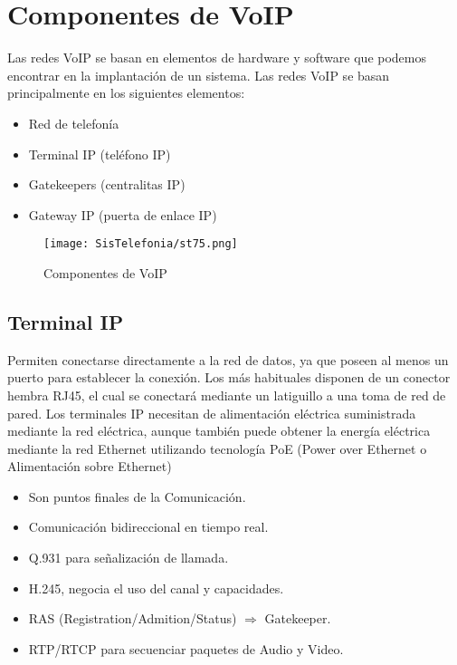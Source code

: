 \documentclass[
	12pt, %
	fleqn, %
	a4paper, %
	oneside, %
]{LegrandOrangeBook}
\begin{document}
\section{Componentes de VoIP}
Las redes VoIP se basan en elementos de hardware y software que podemos encontrar en la implantación de un sistema.
Las redes VoIP se basan principalmente en los siguientes elementos:
\begin{itemize}
\item Red de telefonía
\item Terminal IP (teléfono IP)
\item Gatekeepers (centralitas IP)
\item Gateway IP (puerta de enlace IP)
\end{itemize}
\begin{figure}[H]
\centering
\texttt{[image: SisTelefonia/st75.png]}
\caption{Componentes de VoIP}
\label{fig:componentesvoip}
\end{figure}
\subsection{Terminal IP}
Permiten conectarse directamente a la red de datos, ya que poseen al menos un puerto para establecer la conexión. Los más habituales disponen de un conector hembra RJ45, el cual se conectará mediante un latiguillo a una toma de red de pared. Los terminales IP necesitan de alimentación eléctrica suministrada mediante la red eléctrica, aunque también puede obtener la energía eléctrica mediante la red Ethernet utilizando tecnología PoE (Power over Ethernet o Alimentación sobre Ethernet)
\begin{itemize}
\item Son puntos finales de la Comunicación.
\item Comunicación bidireccional en tiempo real.
\item Q.931 para señalización de llamada.
\item H.245, negocia el uso del canal y capacidades.
\item RAS (Registration/Admition/Status) $\Rightarrow$ Gatekeeper.
\item RTP/RTCP para secuenciar paquetes de Audio y Video.
\end{itemize}
\end{document}
